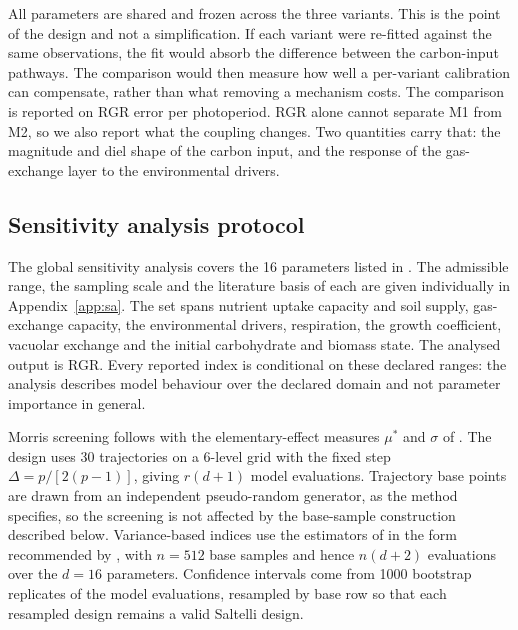 All parameters are shared and frozen across the three variants. This is the
point of the design and not a simplification. If each variant were re-fitted
against the same observations, the fit would absorb the difference between the
carbon-input pathways. The comparison would then measure how well a per-variant
calibration can compensate, rather than what removing a mechanism costs. The comparison is reported on RGR error per photoperiod. RGR alone cannot
separate M1 from M2, so we also report what the coupling changes. Two quantities
carry that: the magnitude and diel shape of the carbon input, and the response of
the gas-exchange layer to the environmental drivers.

\subsection{Sensitivity analysis protocol}

The global sensitivity analysis covers the 16 parameters listed in
. The admissible range, the sampling scale
and the literature basis of each are given individually in
Appendix~\ref{app:sa}. The set spans nutrient uptake capacity
and soil supply, gas-exchange capacity, the environmental drivers, respiration,
the growth coefficient, vacuolar exchange and the initial carbohydrate and
biomass state. The analysed output is RGR. Every reported index is conditional
on these declared ranges: the analysis describes model behaviour over the
declared domain and not parameter importance in general.

Morris screening follows \citet{Morris1991} with the elementary-effect measures
$\mu^\ast$ and $\sigma$ of \citet{Campolongo2007}. The design uses 30
trajectories on a 6-level grid with the fixed step $\Delta = p/[2(p-1)]$, giving
$r(d+1)$ model evaluations. Trajectory base points are drawn from an
independent pseudo-random generator, as the method specifies, so the screening
is not affected by the base-sample construction described below. Variance-based
indices use the estimators of \citet{Sobol2001} in the form recommended by
\citet{Saltelli2010}, with $n=512$ base samples and hence $n(d+2)$ evaluations
over the $d=16$ parameters. Confidence intervals come from 1000 bootstrap
replicates of the model evaluations, resampled by base row so that each
resampled design remains a valid Saltelli design.

